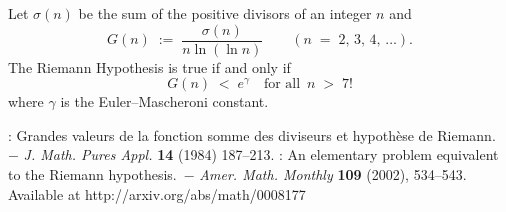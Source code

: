 \documentclass[12pt]{article}
\theoremstyle{definition}
\begin{document}
Let $\sigma(n)$ be the sum of the positive divisors of an integer $n$ and
$$G(n) \;:=\; \frac{\sigma(n)}{n\ln(\ln{n})}  \qquad(n \;=\; 2,\,3,\,4,\,\ldots).$$
The Riemann Hypothesis is true if and only if 
$$G(n) \;<\; e^\gamma \quad \mbox{for all }\, n \;>\; 7!$$
where $\gamma$ is the Euler--Mascheroni constant.

\begin{thebibliography}{8}
: Grandes valeurs de la fonction somme des diviseurs et hypoth\`ese de
Riemann.\, $-$ \emph{J. Math. Pures Appl.} \textbf{14} (1984) 187--213.
: An elementary problem equivalent to the Riemann hypothesis.\, $-$ {\it Amer. Math. Monthly} \textbf{109} (2002), 534--543. Available at http://arxiv.org/abs/math/0008177
\end{thebibliography}

\end{document}
